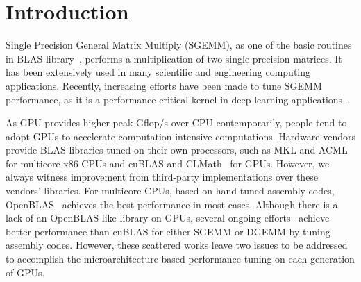 \section{Introduction}
Single Precision General Matrix Multiply (SGEMM), as one 
of the basic routines in BLAS library~\cite{blas}, performs a multiplication of two single-precision matrices. 
It has been extensively used in many scientific and engineering 
computing applications. 
Recently, increasing efforts have been made to tune SGEMM performance, as it is a performance 
critical kernel in deep learning applications~\cite{chetlur2014cudnn,nervana_sgemm_wiki}.

As GPU provides higher peak Gflop/s over CPU contemporarily, people tend to adopt GPUs to accelerate
computation-intensive computations. %
Hardware vendors provide BLAS libraries tuned on their own processors, such as MKL and ACML~\cite{intel2007intel,amd2014} for multicore 
x86 CPUs and cuBLAS and CLMath~\cite{nvidia2008cublas, clmath} for
GPUs. However, we always witness improvement from third-party implementations over these vendors' libraries. For
multicore CPUs, based on hand-tuned assembly codes, OpenBLAS~\cite{xianyi2012openblas} achieves the best performance in 
most cases.
Although there is a lack of an OpenBLAS-like library on GPUs, several ongoing efforts~\cite{tan,lai,nervana_sgemm_wiki,
chien, volkov} achieve better performance than cuBLAS for either SGEMM or DGEMM by tuning assembly codes. However, 
these scattered works leave two issues to be addressed to accomplish the microarchitecture based performance tuning on 
each generation of GPUs.

